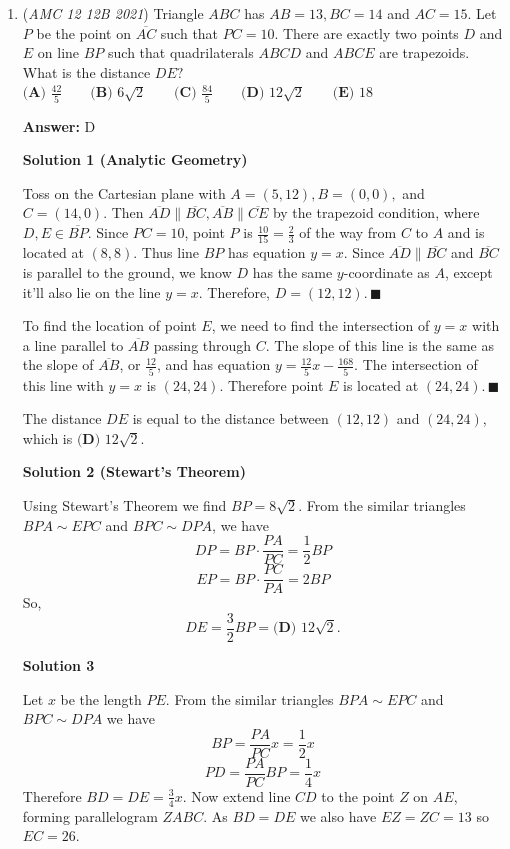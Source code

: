 \begin{enumerate}
 


	\item (\textit{AMC 12 12B 2021}) Triangle $ABC$ has $AB=13,BC=14$ and $AC=15$. Let $P$ be the point on $\overline{AC}$ such that $PC=10$. There are exactly two points $D$ and $E$ on line $BP$ such that quadrilaterals $ABCD$ and $ABCE$ are trapezoids. What is the distance $DE?$
$\textbf{(A) }\frac{42}5 \qquad \textbf{(B) }6\sqrt2 \qquad \textbf{(C) }\frac{84}5\qquad \textbf{(D) }12\sqrt2 \qquad \textbf{(E) }18$

 \textbf{Answer: }D



\textbf{Solution 1 (Analytic Geometry)}

Toss on the Cartesian plane with $A=(5, 12), B=(0, 0),$ and $C=(14, 0)$. Then $\overline{AD}\parallel\overline{BC}, \overline{AB}\parallel\overline{CE}$ by the trapezoid condition, where $D, E\in\overline{BP}$. Since $PC=10$, point $P$ is $\frac{10}{15}=\frac{2}{3}$ of the way from $C$ to $A$ and is located at $(8, 8)$. Thus line $BP$ has equation $y=x$. Since $\overline{AD}\parallel\overline{BC}$ and $\overline{BC}$ is parallel to the ground, we know $D$ has the same $y$-coordinate as $A$, except it'll also lie on the line $y=x$. Therefore, $D=(12, 12). \, \blacksquare$

 To find the location of point $E$, we need to find the intersection of $y=x$ with a line parallel to $\overline{AB}$ passing through $C$. The slope of this line is the same as the slope of $\overline{AB}$, or $\frac{12}{5}$, and has equation $y=\frac{12}{5}x-\frac{168}{5}$. The intersection of this line with $y=x$ is $(24, 24)$. Therefore point $E$ is located at $(24, 24). \,\blacksquare$

 The distance $DE$ is equal to the distance between $(12, 12)$ and $(24, 24)$, which is $\boxed{\textbf{(D) }12\sqrt2}$.

 



\textbf{Solution 2 (Stewart's Theorem)}

Using Stewart's Theorem we find $BP = 8\sqrt{2}$. From the similar triangles $BPA\sim EPC$ and $BPC\sim DPA$, we have
 \[DP = BP\cdot\frac{PA}{PC} = \frac{1}{2}BP\]
 \[EP = BP\cdot\frac{PC}{PA} = 2BP\]So, 
 \[DE = \frac{3}{2}BP = \boxed{\textbf{(D) }12\sqrt2}.\]




\textbf{Solution 3}

Let $x$ be the length $PE$. From the similar triangles $BPA\sim EPC$ and $BPC\sim DPA$ we have
 \[BP = \frac{PA}{PC}x = \frac12 x\]
 \[PD = \frac{PA}{PC}BP = \frac14 x\]Therefore $BD = DE = \frac{3}{4}x$. Now extend line $CD$ to the point $Z$ on $AE$, forming parallelogram $ZABC$. As $BD = DE$ we also have $EZ = ZC = 13$ so $EC = 26$.


\end{enumerate}
